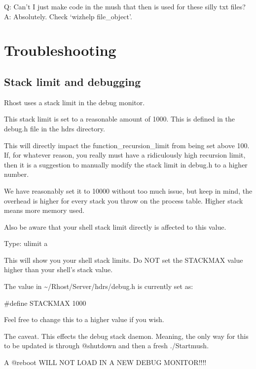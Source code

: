\documentclass[letterpaper,10pt,english]{sphinxmanual}
\begin{document}
\sphinxAtStartPar
Q:  Can’t I just make code in the mush that then is used for these silly txt files?
A:  Absolutely.  Check ‘wizhelp file\_object’.


\section{Troubleshooting}
\label{\detokenize{troubleshooting:troubleshooting}}\label{\detokenize{troubleshooting::doc}}

\subsection{Stack limit and debugging}
\label{\detokenize{troubleshooting:stack-limit-and-debugging}}
\sphinxAtStartPar
Rhost uses a stack limit in the debug monitor.

\sphinxAtStartPar
This stack limit is set to a reasonable amount of 1000.
This is defined in the debug.h file in the hdrs directory.

\sphinxAtStartPar
This will directly impact the function\_recursion\_limit from being
set above 100.  If, for whatever reason, you really must have
a ridiculously high recursion limit, then it is a suggestion to
manually modify the stack limit in debug.h to a higher number.

\sphinxAtStartPar
We have reasonably set it to 10000 without too much issue, but keep
in mind, the overhead is higher for every stack you throw on the
process table.  Higher stack means more memory used.

\sphinxAtStartPar
Also be aware that your shell stack limit directly is affected
to this value.

\sphinxAtStartPar
Type: ulimit \sphinxhyphen{}a

\sphinxAtStartPar
This will show you your shell stack limits.  Do NOT set the
STACKMAX value higher than your shell’s stack value.

\sphinxAtStartPar
The value in \textasciitilde{}/Rhost/Server/hdrs/debug.h is currently set as:

\sphinxAtStartPar
\#define STACKMAX 1000

\sphinxAtStartPar
Feel free to change this to a higher value if you wish.

\sphinxAtStartPar
The caveat.  This effects the debug stack daemon.  Meaning,
the only way for this to be updated is through @shutdown and
then a fresh ./Startmush.

\sphinxAtStartPar
A @reboot WILL NOT LOAD IN A NEW DEBUG MONITOR!!!!
\end{document}
